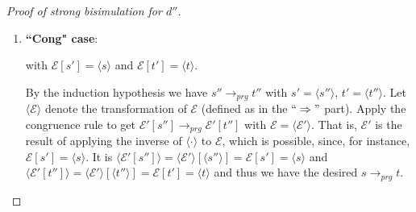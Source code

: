\documentclass[11pt]{article} %
\begin{document}
\begin{proof}[Proof of strong bisimulation for $d''$]
\begin{enumerate}
Now, suppose that $`` q = s' "$ is contained in the part of $\langle prg \rangle$ that results from the application of $d^{core}$ to the relevant part $prg' \subseteq prg$. Thus $\langle s \rangle \longrightarrow_{\langle prg' \rangle^{d^{core}}} \langle t \rangle$.

By (*) we would have

\begin{equation*}
\langle s \rangle \longrightarrow_{\langle prg' \rangle^{d^{core}}} \langle t \rangle \iff s \longrightarrow_{prg'} t,
\end{equation*}

were $prg'$ a well-typed program with copattern coverage for all subterms of $s$. Both of those properties can be shown or simulated similarly to the way they are in the $`` \Rightarrow "$ part.

But it is $prg' \subseteq prg$, as can be seen in the definition of $d''$. This implies the desired $s \longrightarrow_{prg} t$.

\item \textbf{``Cong" case}:

\begin{prooftree}
\end{prooftree}

with $\mathcal{E}[s'] = \langle s \rangle$ and $\mathcal{E}[t'] = \langle t \rangle$.

By the induction hypothesis we have $s'' \longrightarrow_{prg} t''$ with $s' = \langle s'' \rangle$, $t' = \langle t'' \rangle$. Let $\langle \mathcal{E} \rangle$ denote the transformation of $\mathcal{E}$ (defined as in the $`` \Rightarrow "$ part). Apply the congruence rule to get $\mathcal{E}'[s''] \longrightarrow_{prg} \mathcal{E}'[t'']$ with $\mathcal{E} = \langle \mathcal{E}' \rangle$. That is, $\mathcal{E}'$ is the result of applying the inverse of $\langle \cdot \rangle$ to $\mathcal{E}$, which is possible, since, for instance, $\mathcal{E}[s'] = \langle s \rangle$. It is $\langle \mathcal{E}'[s''] \rangle = \langle \mathcal{E}' \rangle[\langle s'' \rangle] = \mathcal{E}[s'] = \langle s \rangle$ and $\langle \mathcal{E}'[t''] \rangle = \langle \mathcal{E}' \rangle[\langle t'' \rangle] = \mathcal{E}[t'] = \langle t \rangle$ and thus we have the desired $s \longrightarrow_{prg} t$.
\end{enumerate}

\end{proof}
\end{document}
